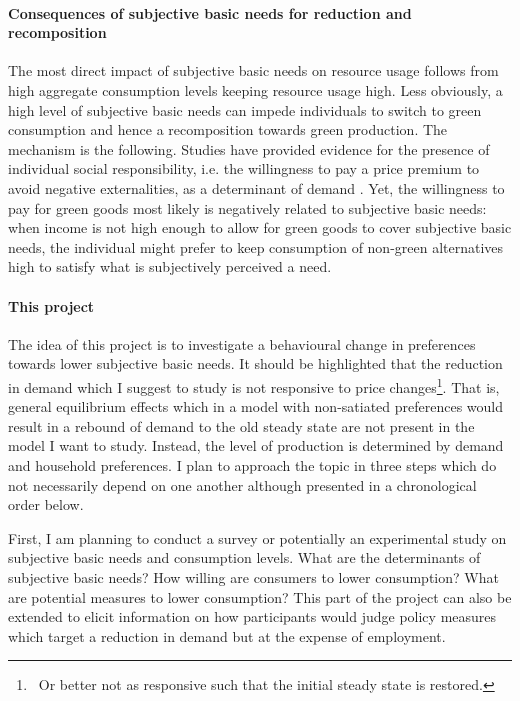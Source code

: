 \documentclass[12pt]{article}
\begin{document}
\paragraph{Consequences of subjective basic needs for reduction and recomposition}
The most direct impact of subjective basic needs on resource usage follows from high aggregate consumption levels keeping resource usage high. Less obviously, a high level of subjective basic needs can impede individuals to switch to green consumption and hence a recomposition towards green production. The mechanism is the following. Studies have provided evidence for the presence of individual social responsibility, i.e. the willingness to pay a price premium to avoid negative externalities, as a determinant of demand \citep[compare][]{Bartling2015DoResponsibility}. Yet, the willingness to pay for green goods most likely is negatively related to subjective basic needs: when income is not high enough to allow for green goods to cover subjective basic needs, the individual might prefer to keep consumption of non-green alternatives high to satisfy what is subjectively perceived a need. 

\paragraph{This project}
The idea of this project is to investigate a behavioural change in preferences towards lower subjective basic needs. 
It should be highlighted that the reduction in demand which I suggest to study is not responsive to price changes\footnote{\ Or better not as responsive such that the initial steady state is restored.}. That is, general equilibrium effects which in a model with non-satiated preferences would result in a rebound of demand to the old steady state are not present in the model I want to study. Instead, the level of production is determined by demand and household preferences.
I plan to approach the topic in three steps which do not necessarily depend on one another although presented in a chronological order below.

First, I am planning to conduct a survey or potentially an experimental study on subjective basic needs and consumption levels. What are the determinants of subjective basic needs? How willing are consumers to lower consumption? What are potential measures to lower consumption? 
This part of the project can also be extended to elicit information on how participants would judge policy measures which target a reduction in demand but at the expense of employment. 
\end{document}
